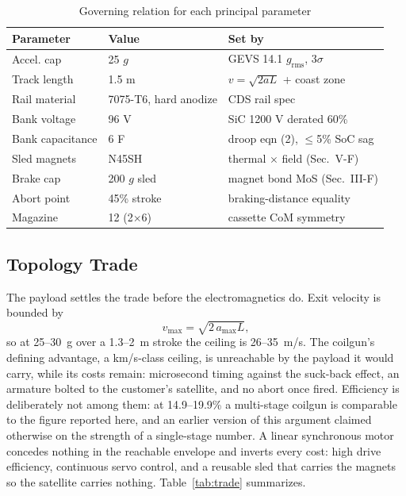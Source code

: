 \documentclass[conference]{IEEEtran}
\begin{document}
\begin{table}[t]
\caption{Governing relation for each principal parameter}
\label{tab:derive}
\centering\footnotesize
\begin{tabular}{lll}
\toprule
Parameter & Value & Set by\\
\midrule
Accel. cap & 25 $g$ & GEVS 14.1 $g_{\mathrm{rms}}$, $3\sigma$ \cite{gevs}\\
Track length & 1.5 m & $v=\sqrt{2aL}$ + coast zone\\
Rail material & 7075-T6, hard anodize & CDS rail spec \cite{cds}\\
Bank voltage & 96 V & SiC 1200 V derated 60\%\\
Bank capacitance & 6 F & droop eqn (2), $\le$5\% SoC sag\\
Sled magnets & N45SH & thermal $\times$ field (Sec.~V-F)\\
Brake cap & 200 $g$ sled & magnet bond MoS (Sec.~III-F)\\
Abort point & 45\% stroke & braking-distance equality\\
Magazine & 12 (2$\times$6) & cassette CoM symmetry\\
\bottomrule
\end{tabular}
\end{table}

\subsection{Topology Trade}
The payload settles the trade before the electromagnetics do. Exit velocity is bounded by
\begin{equation}
v_{\max}=\sqrt{2\,a_{\max}L},
\end{equation}
so at 25--30~g over a 1.3--2~m stroke the ceiling is 26--35~m/s. The coilgun's defining advantage, a km/s-class ceiling, is unreachable by the payload it would carry, while its costs remain: microsecond timing against the suck-back effect, an armature bolted to the customer's satellite, and no abort once fired. Efficiency is deliberately not among them: at 14.9--19.9\% \cite{feng2025} a multi-stage coilgun is comparable to the figure reported here, and an earlier version of this argument claimed otherwise on the strength of a single-stage number. A linear synchronous motor concedes nothing in the reachable envelope and inverts every cost: high drive efficiency, continuous servo control, and a reusable sled that carries the magnets so the satellite carries nothing. Table~\ref{tab:trade} summarizes.
\end{document}
